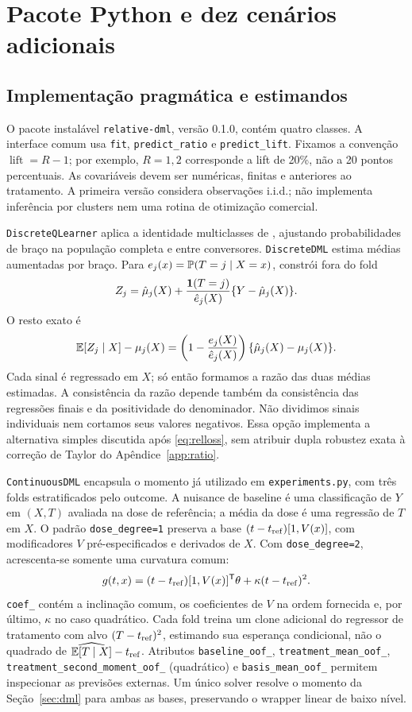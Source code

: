 \section{Pacote Python e dez cenários adicionais}
\label{sec:package}
\subsection{Implementação pragmática e estimandos}
O pacote instalável \texttt{relative-dml}, versão 0.1.0, contém quatro classes. A interface comum usa \texttt{fit}, \texttt{predict\_ratio} e \texttt{predict\_lift}. Fixamos a convenção $\operatorname{lift}=R-1$; por exemplo, $R=1{,}2$ corresponde a lift de 20\%, não a 20 pontos percentuais. As covariáveis devem ser numéricas, finitas e anteriores ao tratamento. A primeira versão considera observações i.i.d.; não implementa inferência por clusters nem uma rotina de otimização comercial.

\texttt{DiscreteQLearner} aplica a identidade multiclasses de \cite{fuchs2026}, ajustando probabilidades de braço na população completa e entre conversores. \texttt{DiscreteDML} estima médias aumentadas por braço. Para $e_j(x)=\mathbb P(T=j\mid X=x)$, constrói fora do fold
\[
Z_j=\hat\mu_j(X)+\frac{\mathbf 1(T=j)}{\hat e_j(X)}\{Y-\hat\mu_j(X)\}.
\]
O resto exato é
\[
\mathbb E[Z_j\mid X]-\mu_j(X)
=\left(1-\frac{e_j(X)}{\hat e_j(X)}\right)\{\hat\mu_j(X)-\mu_j(X)\}.
\]
Cada sinal é regressado em $X$; só então formamos a razão das duas médias estimadas. A consistência da razão depende também da consistência das regressões finais e da positividade do denominador. Não dividimos sinais individuais nem cortamos seus valores negativos. Essa opção implementa a alternativa simples discutida após \eqref{eq:relloss}, sem atribuir dupla robustez exata à correção de Taylor do Apêndice~\ref{app:ratio}.

\texttt{ContinuousDML} encapsula o momento já utilizado em \texttt{experiments.py}, com três folds estratificados pelo outcome. A nuisance de baseline é uma classificação de $Y$ em $(X,T)$ avaliada na dose de referência; a média da dose é uma regressão de $T$ em $X$. O padrão \texttt{dose\_degree=1} preserva a base $(t-t_{\rm ref})[1,V(x)]$, com modificadores $V$ pré-especificados e derivados de $X$. Com \texttt{dose\_degree=2}, acrescenta-se somente uma curvatura comum:
\[
g(t,x)=(t-t_{\rm ref})[1,V(x)]^{\mathsf T}\theta
       +\kappa(t-t_{\rm ref})^2.
\]
\texttt{coef\_} contém a inclinação comum, os coeficientes de $V$ na ordem fornecida e, por último, $\kappa$ no caso quadrático. Cada fold treina um clone adicional do regressor de tratamento com alvo $(T-t_{\rm ref})^2$, estimando sua esperança condicional, não o quadrado de $\widehat{\mathbb E[T\mid X]}-t_{\rm ref}$. Atributos \texttt{baseline\_oof\_}, \texttt{treatment\_mean\_oof\_}, \texttt{treatment\_second\_moment\_oof\_} (quadrático) e \texttt{basis\_mean\_oof\_} permitem inspecionar as previsões externas. Um único solver resolve o momento da Seção~\ref{sec:dml} para ambas as bases, preservando o wrapper linear de baixo nível.


